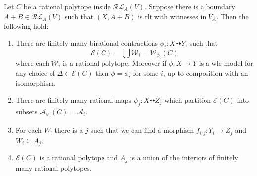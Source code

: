 \documentclass[a4paper,12pt]{amsart}
\begin{document}
	\begin{theorem}\label{rltfiniteness}
		Let $C$ be a rational polytope inside $\mathcal{RL}_{A}(V)$. Suppose there is a boundary $A+B \in \mathcal{RL}_{A}(V)$ such that $(X,A+B)$ is rlt with witnesses in $V_{A}$. Then the following hold:
		
		\begin{enumerate}
			\item There are finitely many birational contractions $\phi_{i}:X \dashrightarrow Y_{i}$ such that 
			\[\mathcal{E}(C) = \bigcup \mathcal{W}_{i}=\mathcal{W}_{\phi_{i}}(C)\]
			where each $\mathcal{W}_{i}$ is a rational polytope. Moreover if $\phi:X \to Y$ is a wlc model for any choice of $\Delta \in \mathcal{E}(C)$ then $\phi=\phi_{i}$ for some $i$, up to composition with an isomorphism.
			
			\item There are finitely many rational maps $\psi_{j}:X \dashrightarrow Z_{j}$ which partition $\mathcal{E}(C)$ into subsets $\mathcal{A}_{\psi_{j}}(C)=\mathcal{A}_{i}$.
			\item  For each $W_{i}$ there is a $j$ such that we can find a morphism $f_{i,j}: Y_{i} \to Z_{j}$ and $W_{i} \subseteq \overline{A_{j}}$.
			\item  $\mathcal{E}(C)$ is a rational polytope and $A_{j}$ is a union of the interiors of finitely many rational polytopes.
		\end{enumerate}
	\end{theorem}
	
\end{document}
